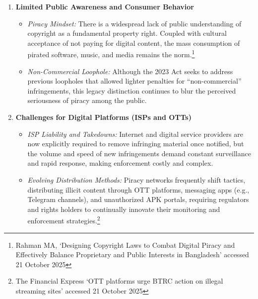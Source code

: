 \documentclass[10pt,letterpaper]{article}
\begin{document}
\begin{enumerate}
\begin{itemize}
        \item \textit{Digital Rights Management (DRM) Circumvention:} Persistent efforts by piracy groups to bypass DRM and other technological protection measures (TPMs) undermine creators’ ability to protect digital works and escalate the costs of enforcement.
    \end{itemize}

    \item \textbf{Limited Public Awareness and Consumer Behavior}
    \begin{itemize}
        \item \textit{Piracy Mindset:} There is a widespread lack of public understanding of copyright as a fundamental property right. Coupled with cultural acceptance of not paying for digital content, the mass consumption of pirated software, music, and media remains the norm.\footnote{Rahman MA, `Designing Copyright Laws to Combat Digital Piracy and Effectively Balance Proprietary and Public Interests in Bangladesh'  accessed 21 October 2025}
        \item \textit{Non-Commercial Loophole:} Although the 2023 Act seeks to address previous loopholes that allowed lighter penalties for ``non-commercial'' infringements, this legacy distinction continues to blur the perceived seriousness of piracy among the public.
    \end{itemize}

    \item \textbf{Challenges for Digital Platforms (ISPs and OTTs)}
    \begin{itemize}
        \item \textit{ISP Liability and Takedowns:} Internet and digital service providers are now explicitly required to remove infringing material once notified, but the volume and speed of new infringements demand constant surveillance and rapid response, making enforcement costly and complex.
        \item \textit{Evolving Distribution Methods:} Piracy networks frequently shift tactics, distributing illicit content through OTT platforms, messaging apps (e.g., Telegram channels), and unauthorized APK portals, requiring regulators and rights holders to continually innovate their monitoring and enforcement strategies.\footnote{The Financial Express `OTT platforms urge BTRC action on illegal streaming sites'  accessed 21 October 2025}
    \end{itemize}


\end{enumerate}
\end{document}
